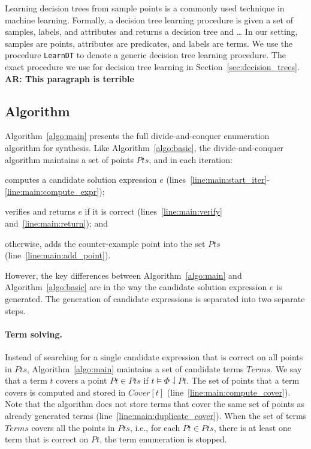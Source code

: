 \documentclass{llncs}
\newcommand\arsays[1]{{\bf AR: #1}}
\newcommand\Points{\mathit{Pts}}
\newcommand\Point{\mathit{Pt}}
\newcommand\Expr{e}
\newcommand\Terms{\mathit{Terms}}
\newcommand\Term{t}
\newcommand\Cover{\mathit{Cover}}
\newcommand\Spec{\Phi}
\begin{document}
Learning decision trees from sample points is a commonly used technique
in machine learning.
Formally, a decision tree learning procedure is given a set of samples,
labels, and attributes and returns a decision tree and \dots
In our setting, samples are points, attributes are predicates, and
labels are terms.
We use the procedure {\tt LearnDT} to denote a generic decision tree
learning procedure.
The exact procedure we use for decision tree learning in
Section~\ref{sec:decision_trees}.
\arsays{This paragraph is terrible}

\subsection{Algorithm}
\label{sec:algo}

Algorithm~\ref{algo:main} presents the full divide-and-conquer
enumeration algorithm for synthesis.
Like Algorithm~\ref{algo:basic}, the divide-and-conquer algorithm
maintains a set of points $\Points$, and in each iteration:
\begin{inparaenum}[(a)]
\item computes a candidate solution expression $\Expr$
  (lines~\ref{line:main:start_iter}-\ref{line:main:compute_expr});
\item verifies and returns $\Expr$ if it is correct (lines~\ref{line:main:verify}
  and~\ref{line:main:return}); and
\item otherwise, adds the counter-example point into the set $\Points$
  (line~\ref{line:main:add_point}).
\end{inparaenum}

However, the key differences between Algorithm~\ref{algo:main} and
Algorithm~\ref{algo:basic} are in the way the candidate solution
expression $\Expr$ is generated.
The generation of candidate expressions is separated into two separate
steps.

\paragraph{Term solving.}
Instead of searching for a single candidate expression that is correct
on all points in $\Points$, Algorithm~\ref{algo:main} maintains a set of
candidate terms $\Terms$.
We say that a term $\Term$ covers a point $\Point \in \Points$ if $\Term
\models \Spec \downharpoonleft \Point$.
The set of points that a term covers is computed and stored in
$\Cover[\Term]$ (line~\ref{line:main:compute_cover}).
Note that the algorithm does not store terms that cover the same set of
points as already generated terms
(line~\ref{line:main:duplicate_cover}).
When the set of terms $\Terms$ covers all the points in $\Points$, i.e., for
each $\Point \in \Points$, there is at least one term that is correct on
$\Point$, the term enumeration is stopped.
\end{document}
